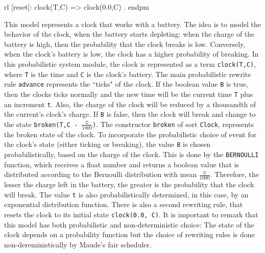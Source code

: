 \begin{example}
\begin{maude}[mathescape=true]
  rl [reset]: clock(T,C) => clock(0.0,C) .
endpm
\end{maude}
This model represents a clock that works with a battery. The idea is to model the behavior of the clock, when the battery starts depleting: when the charge of the battery is high, then the probability that the clock breaks is low. Conversely, when the clock's battery is low, the clock has a higher probability of breaking. In this probabilistic system module, the clock is represented as a term \texttt{clock(T,C)}, where \texttt{T} is the time and \texttt{C} is the clock's battery. The main probabilistic rewrite rule \texttt{advance} represents the ``ticks" of the clock. If the boolean value \texttt{B} is true, then the clocks ticks normally and the new time will be the current time \texttt{T} plus an increment \texttt{t}. Also, the charge of the clock will be reduced by a thousandth of the current's clock's charge. If \texttt{B} is false, then the clock will break and change to the state \texttt{broken(T,C - $\frac{\texttt{C}}{1000}$)}. The constructor \texttt{broken} of sort \texttt{Clock}, represents the broken state of the clock. To incorporate the probabilistic choice of event for the clock's state (either ticking or breaking), the value \texttt{B} is chosen probabilistically, based on the charge of the clock. This is done by the \texttt{BERNOULLI} function, which receives a float number and returns a boolean value that is distributed according to the Bernoulli distribution with mean $\frac{\texttt{C}}{1000}$. Therefore, the lesser the charge left in the battery, the greater is the probability that the clock will break. The value \texttt{t} is also probabilistically determined, in this case, by an exponential distribution function.
There is also a second rewriting rule, that resets the clock to its initial state \texttt{clock(0.0, C)}. It is important to remark that this model has both probabilistic and non-deterministic choice: The state of the clock depends on a probability function but the choice of rewriting rules is done non-dereministically by Maude's fair scheduler.
\end{example}


